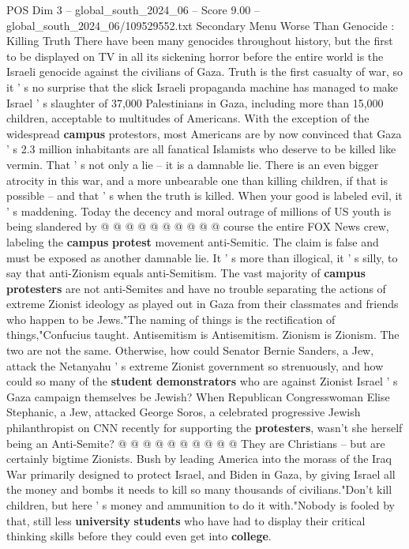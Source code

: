 \begin{textsample}{POS Dim 3 – global\_south\_2024\_06 – Score 9.00 – global\_south\_2024\_06/109529552.txt}  \label{ex:f3_pos_346}
Secondary Menu Worse Than Genocide : Killing Truth There have been many genocides throughout history, but the first to be displayed on TV in all its sickening horror before the entire world is the Israeli genocide against the civilians of Gaza.
Truth is the first casualty of war, so it ' s no surprise that the slick Israeli propaganda machine has managed to make Israel ' s slaughter of 37,000 Palestinians in Gaza, including more than 15,000 children, acceptable to multitudes of Americans.
With the exception of the widespread \textbf{campus} protestors, most Americans are by now convinced that Gaza ' s 2.3 million inhabitants are all fanatical Islamists who deserve to be killed like vermin.
That ' s not only a lie -- it is a damnable lie.
There is an even bigger atrocity in this war, and a more unbearable one than killing children, if that is possible -- and that ' s when the truth is killed.
When your good is labeled evil, it ' s maddening.
Today the decency and moral outrage of millions of US youth is being slandered by @ @ @ @ @ @ @ @ @ @ course the entire FOX News crew, labeling the \textbf{campus} \textbf{protest} movement anti-Semitic.
The claim is false and must be exposed as another damnable lie.
It ' s more than illogical, it ' s silly, to say that anti-Zionism equals anti-Semitism.
The vast majority of \textbf{campus} \textbf{protesters} are not anti-Semites and have no trouble separating the actions of extreme Zionist ideology as played out in Gaza from their classmates and friends who happen to be Jews."The naming of things is the rectification of things,"Confucius taught.
Antisemitism is Antisemitism.
Zionism is Zionism.
The two are not the same.
Otherwise, how could Senator Bernie Sanders, a Jew, attack the Netanyahu ' s extreme Zionist government so strenuously, and how could so many of the \textbf{student} \textbf{demonstrators} who are against Zionist Israel ' s Gaza campaign themselves be Jewish?
When Republican Congresswoman Elise Stephanic, a Jew, attacked George Soros, a celebrated progressive Jewish philanthropist on CNN recently for supporting the \textbf{protesters}, wasn't she herself being an Anti-Semite? @ @ @ @ @ @ @ @ @ @ They are Christians -- but are certainly bigtime Zionists.
Bush by leading America into the morass of the Iraq War primarily designed to protect Israel, and Biden in Gaza, by giving Israel all the money and bombs it needs to kill so many thousands of civilians."Don't kill children, but here ' s money and ammunition to do it with."Nobody is fooled by that, still less \textbf{university} \textbf{students} who have had to display their critical thinking skills before they could even get into \textbf{college}.

\end{textsample}
